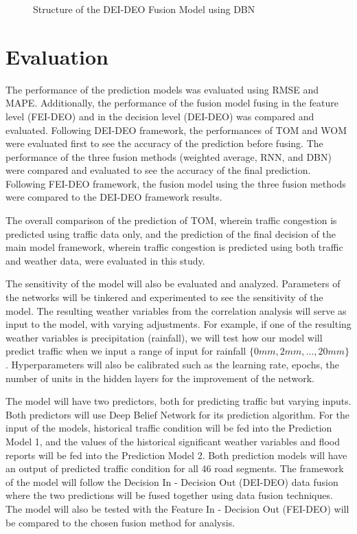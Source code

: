 \begin{figure}[h]
	\centering
	\captionsetup{justification=centering}
	\caption{Structure of the DEI-DEO Fusion Model using DBN}
	\label{fig:deideo_dbn}
\end{figure}
\section{Evaluation}
The performance of the prediction models was evaluated using RMSE and MAPE. Additionally, the performance of the fusion model fusing in the feature level (FEI-DEO) and in the decision level (DEI-DEO) was compared and evaluated. Following DEI-DEO framework, the performances of TOM and WOM were evaluated first to see the accuracy of the prediction before fusing. The performance of the three fusion methods (weighted average, RNN, and DBN) were compared and evaluated to see the accuracy of the final prediction. Following FEI-DEO framework, the fusion model using the three fusion methods were compared to the DEI-DEO framework results. 

The overall comparison of the prediction of TOM, wherein traffic congestion is predicted using traffic data only, and the prediction of the final decision of the main model framework, wherein traffic congestion is predicted using both traffic and weather data, were evaluated in this study. 


The sensitivity of the model will also be evaluated and analyzed. Parameters of the networks will be tinkered and experimented to see the sensitivity of the model. The resulting weather variables from the correlation analysis will serve as input to the model, with varying adjustments. For example, if one of the resulting weather variables is precipitation (rainfall), we will test how our model will predict traffic when we input a range of input for rainfall $\{0mm, 2mm, …, 20mm\}$. Hyperparameters will also be calibrated such as the learning rate, epochs, the number of units in the hidden layers for the improvement of the network.


The model will have two predictors, both for predicting traffic but varying inputs. Both predictors will use Deep Belief Network for its prediction algorithm. For the input of the models, historical traffic condition will be fed into the Prediction Model 1, and the values  of the historical significant weather variables and flood reports will be fed into the Prediction Model 2. Both prediction models will have an output of predicted traffic condition for all 46 road segments. The framework of the model will follow the Decision In - Decision Out (DEI-DEO) data fusion where the two predictions will be fused together using data fusion techniques. The model will also be tested with the Feature In - Decision Out (FEI-DEO) will be compared to the chosen fusion method for analysis.

